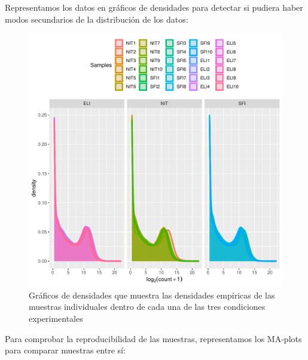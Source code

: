 \documentclass[
  english,
]{article}
\begin{document}
Representamos los datos en gráficos de densidades para detectar si
pudiera haber modos secundarios de la distribución de los datos:

\begin{figure}
\centering
\includegraphics{ortega_rita_ADO_PEC2_files/figure-latex/density plot-1.pdf}
\caption{Gráficos de densidades que muestra las densidades empíricas de
las muestras individuales dentro de cada una de las tres condiciones
experimentales}
\end{figure}

Para comprobar la reproducibilidad de las muestras, representamos los
MA-plots para comparar muestras entre sí:
\end{document}
